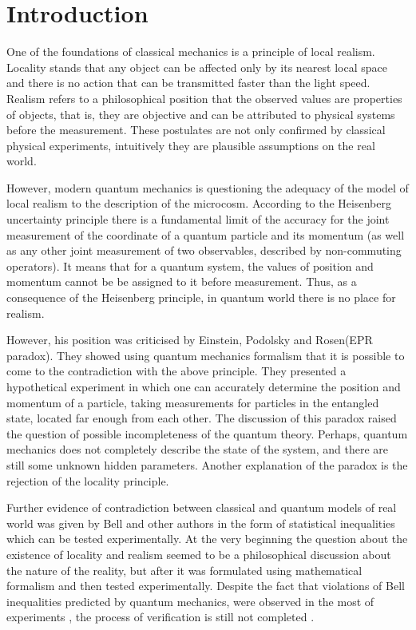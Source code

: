 \documentclass[11pt]{article}
\begin{document}
\section{Introduction}
One of the foundations of classical mechanics is a principle of local realism. Locality stands that any object can be affected only by its nearest local space and there is no action that can be transmitted faster than the light speed. Realism refers to a philosophical position that the observed values are properties of objects, that is, they are objective and can be attributed to physical systems before the measurement. These postulates are not only confirmed by classical physical experiments, intuitively they are plausible assumptions on the real world.

However, modern quantum mechanics is questioning the adequacy of the model of local realism to the description of the microcosm. According to the Heisenberg uncertainty principle there is a fundamental limit of the accuracy for the joint measurement of the coordinate of a quantum particle and its momentum (as well as any other joint measurement of two observables, described by non-commuting operators). It means that for a quantum system, the values of position and momentum cannot be be assigned to it before measurement. Thus, as a consequence of the Heisenberg principle, in quantum world there is no place for realism.

However, his position was criticised by Einstein, Podolsky and Rosen(EPR paradox)\cite{EPR}. They showed using quantum mechanics formalism that it is possible to come to the contradiction with the above principle. They presented a hypothetical experiment in which one can accurately determine the position and momentum of a particle, taking measurements for particles in the entangled state, located far enough from each other. The discussion of this paradox raised the question of possible incompleteness of the quantum theory. Perhaps, quantum mechanics does not completely describe the state of the system, and there are still some unknown hidden parameters. Another explanation of the paradox is the rejection of the locality principle.

Further evidence of contradiction between classical and quantum models of real world was given by Bell and other authors in the form of statistical inequalities which can be tested experimentally. At the very beginning the question about the existence of locality and realism seemed to be a philosophical discussion about the nature of the reality, but after it was formulated using mathematical formalism and then tested experimentally. Despite the fact that violations of Bell inequalities predicted by quantum mechanics, were observed in the most of experiments \cite{ASP1}, the process of verification is still not completed \cite{Khrennikov_preprint}.
\end{document}
